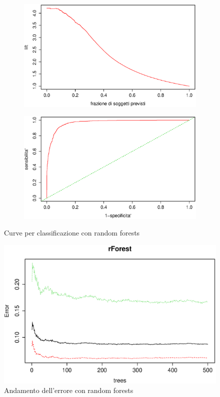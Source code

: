 \begin{figure}[H]
  \begin{subfigure}{0.4\textwidth}
    \includegraphics[width=\columnwidth]{images/class/lift-rForests.eps}
  \end{subfigure}
  \hspace*{\fill}
  \begin{subfigure}{0.4\textwidth}
    \includegraphics[width=\columnwidth]{images/class/roc-rForests.eps}
  \end{subfigure}
  \caption{Curve per classificazione con random forests}
  \label{fig:class-tree}
\end{figure}

\begin{figure}[H]
  \centering
  \includegraphics[width=.5\columnwidth]{images/class/rForests-plot.eps}
  \caption{Andamento dell'errore con random forests}
  \label{fig:final-class-tree}
\end{figure}

